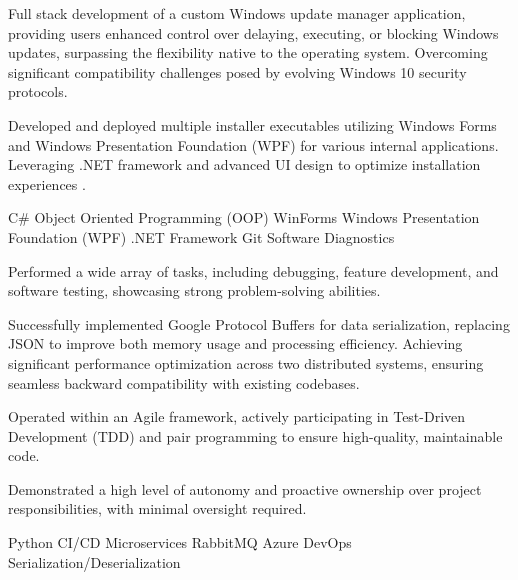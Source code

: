\documentclass[]{farzad-resume}
\begin{document}
\begin{minipage}[t]{\textwidth}
\begin{tightemize}
{\item Full stack development of a custom Windows update manager application, providing users enhanced
control over delaying, executing, or blocking Windows updates, surpassing the flexibility native to
the operating system. Overcoming significant compatibility challenges posed by evolving Windows 10 security protocols.

\item Developed and deployed multiple installer executables utilizing Windows Forms and Windows Presentation Foundation (WPF) for various internal applications. Leveraging .NET framework and advanced UI design to optimize installation experiences .}
\end{tightemize}

\begin{skillsection}
{ C\# \textbullet{} Object Oriented Programming (OOP) \textbullet{} WinForms \textbullet{} Windows Presentation Foundation (WPF) \textbullet{} .NET Framework \textbullet{} Git \textbullet{} Software Diagnostics}
\end{skillsection}

\sectionsep


\vspace{\topsep}
\begin{tightemize}
    {\fontsize{8}{10.4} \selectfont 
	\item Performed a wide array of tasks, including debugging, feature development, and software testing, showcasing strong problem-solving abilities.
	\item Successfully implemented Google Protocol Buffers for data serialization, replacing JSON to improve both memory usage and processing efficiency. Achieving significant performance optimization across two distributed systems, ensuring seamless backward compatibility with existing codebases.
	\item Operated within an Agile framework, actively participating in Test-Driven Development (TDD) and pair programming to ensure high-quality, maintainable code.
	\item Demonstrated a high level of autonomy and proactive ownership over project responsibilities, with minimal oversight required.}
\end{tightemize}

\begin{skillsection}
{ Python \textbullet{} CI/CD \textbullet{} Microservices \textbullet{} RabbitMQ  \textbullet{} Azure DevOps \textbullet{} Serialization/Deserialization}


\end{skillsection}
\end{minipage}
\end{document}

